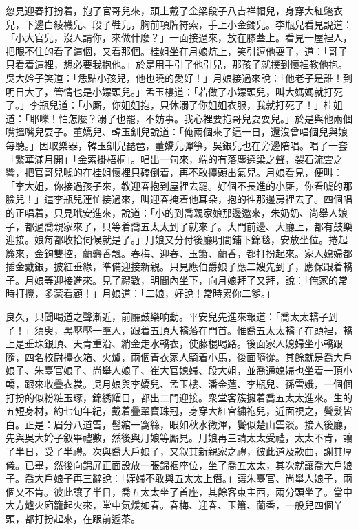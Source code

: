 忽見迎春打扮着，抱了官哥兒來，頭上戴了金梁段子八吉祥帽兒，身穿大紅氅衣兒，下邊白綾襪兒、段子鞋兒，胸前項牌符索，手上小金鐲兒。李瓶兒看見說道：「小大官兒，沒人請你，來做什麼？」一面接過來，放在膝蓋上。看見一屋裡人，把眼不住的看了這個，又看那個。桂姐坐在月娘炕上，笑引逗他耍子，道：「哥子只看着這裡，想必要我抱他。」於是用手引了他引兒，那孩子就撲到懷裡教他抱。吳大妗子笑道：「恁點小孩兒，他也曉的愛好！」月娘接過來說：「他老子是誰！到明日大了，管情也是小嫖頭兒。」孟玉樓道：「若做了小嫖頭兒，叫大媽媽就打死了。」李瓶兒道：「小厮，你姐姐抱，只休溺了你姐姐衣服，我就打死了！」桂姐道：「耶嚛！怕怎麼？溺了也罷，不妨事。我心裡要抱哥兒耍耍兒。」於是與他兩個嘴搵嘴兒耍子。董嬌兒、韓玉釧兒說道：「俺兩個來了這一日，還沒曾唱個兒與娘每聽。」因取樂器，韓玉釧兒琵琶，董嬌兒彈箏，吳銀兒也在旁邊陪唱。唱了一套「繁華滿月開」「金索掛梧桐」。唱出一句來，端的有落塵遶梁之聲，裂石流雲之響，把官哥兒唬的在桂姐懷裡只磕倒着，再不敢擡頭出氣兒。月娘看見，便叫：「李大姐，你接過孩子來，教迎春抱到屋裡去罷。好個不長進的小厮，你看唬的那臉兒！」這李瓶兒連忙接過來，叫迎春掩着他耳朵，抱的徃那邊房裡去了。四個唱的正唱着，只見玳安進來，說道：「小的到喬親家娘那邊邀來，朱奶奶、尚舉人娘子，都過喬親家來了，只等着喬五太太到了就來了。大門前邊、大廳上，都有鼓樂迎接。娘每都收拾伺候就是了。」月娘又分付後廳明間鋪下錦毯，安放坐位。捲起簾來，金鉤雙控，蘭麝香飄。春梅、迎春、玉簫、蘭香，都打扮起來。家人媳婦都插金戴銀，披紅垂綠，準備迎接新親。只見應伯爵娘子應二嫂先到了，應保跟着轎子。月娘等迎接進來。見了禮數，明間內坐下，向月娘拜了又拜，說：「俺家的常時打攪，多蒙看顧！」月娘道：「二娘，好說！常時累你二爹。」

良久，只聞喝道之聲漸近，前廳鼓樂响動。平安兒先進來報道：「喬太太轎子到了！」須臾，黑壓壓一羣人，跟着五頂大轎落在門首。惟喬五太太轎子在頭裡，轎上是垂珠銀頂、天青重沿、綃金走水轎衣，使藤棍喝路。後面家人媳婦坐小轎跟隨，四名校尉擡衣箱、火爐，兩個青衣家人騎着小馬，後面隨從。其餘就是喬大戶娘子、朱臺官娘子、尚舉人娘子、崔大官媳婦、段大姐，並喬通媳婦也坐着一頂小轎，跟來收疊衣裳。吳月娘與李嬌兒、孟玉樓、潘金蓮、李瓶兒、孫雪娥，一個個打扮的似粉粧玉琢，錦綉耀目，都出二門迎接。衆堂客簇擁着喬五太太進來。生的五短身材，約七旬年紀，戴着疊翠寶珠冠，身穿大紅宮繡袍兒，近面視之，鬢髮皆白。正是：眉分八道雪，髻綰一窩絲，眼如秋水微渾，鬢似楚山雲淡。接入後廳，先與吳大妗子叙畢禮數，然後與月娘等厮見。月娘再三請太太受禮，太太不肯，讓了半日，受了半禮。次與喬大戶娘子，又叙其新親家之禮，彼此道及款曲，謝其厚儀。已畢，然後向錦屏正面設放一張錦裀座位，坐了喬五太太，其次就讓喬大戶娘子。喬大戶娘子再三辭說：「姪婦不敢與五太太上僭。」讓朱臺官、尚舉人娘子，兩個又不肯。彼此讓了半日，喬五太太坐了首座，其餘客東主西，兩分頭坐了。當中大方爐火廂籠起火來，堂中氣煖如春。春梅、迎春、玉簫、蘭香，一般兒四個丫頭，都打扮起來，在跟前遞茶。

